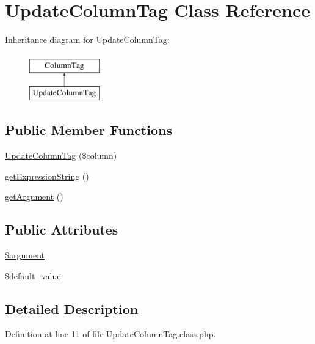 \hypertarget{classUpdateColumnTag}{\section{Update\-Column\-Tag Class Reference}
\label{classUpdateColumnTag}
}
Inheritance diagram for Update\-Column\-Tag\-:\begin{figure}[H]
\begin{center}
\leavevmode
\includegraphics[height=2.000000cm]{classUpdateColumnTag}
\end{center}
\end{figure}
\subsection*{Public Member Functions}
\begin{DoxyCompactItemize}
\item 
\hyperlink{classUpdateColumnTag_a08118f413b38890ca779e44974447854}{Update\-Column\-Tag} (\$column)
\item 
\hyperlink{classUpdateColumnTag_a16ab982f05143f8e0c4550f02ebe2357}{get\-Expression\-String} ()
\item 
\hyperlink{classUpdateColumnTag_a6b6cca5c598d435f3f40caf96f5dea4a}{get\-Argument} ()
\end{DoxyCompactItemize}
\subsection*{Public Attributes}
\begin{DoxyCompactItemize}
\item 
\hyperlink{classUpdateColumnTag_a3312163ccabc7246e2f397390648b75b}{\$argument}
\item 
\hyperlink{classUpdateColumnTag_a63420aa5c0b8c374a4f29d054abbda76}{\$default\-\_\-value}
\end{DoxyCompactItemize}


\subsection{Detailed Description}


Definition at line 11 of file Update\-Column\-Tag.\-class.\-php.



